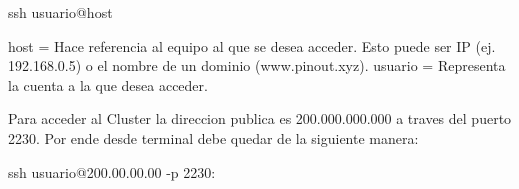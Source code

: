 ssh {usuario}@{host}

{host} = Hace referencia al equipo al que se desea acceder. Esto puede ser IP (ej. 192.168.0.5) o el nombre de un dominio (www.pinout.xyz).
{usuario} = Representa la cuenta a la que desea acceder.

Para acceder al Cluster la direccion publica es 200.000.000.000 a traves del puerto 2230. Por ende desde terminal debe quedar de la siguiente manera:

ssh {usuario}@200.00.00.00 -p 2230:
